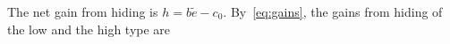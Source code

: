 The net gain from hiding is $h=b\tilde e-c_0$. By~\eqref{eq:gains}, the gains from hiding of the low and the high type are
